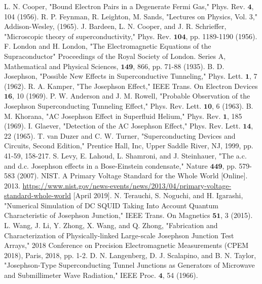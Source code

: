 \documentclass[letterpaper,english,reprint, aps]{revtex4-1}
\begin{document}
\begin{thebibliography}{}
 L. N. Cooper, "Bound Electron Pairs in a Degenerate Fermi Gas," Phys. Rev. $\boldsymbol{4}$, 104 (1956).
 R. P. Feynman, R. Leighton, M. Sands, "Lectures on Physics, Vol. 3," Addison-Wesley, (1965). 
 J. Bardeen, L. N. Cooper, and J. R. Schrieffer, "Microscopic theory of superconductivity," Phys. Rev. $\boldsymbol{104}$, pp. 1189-1190 (1956). 
 F. London and  H. London, "The Electromagnetic Equations of the Supraconductor" Proceedings of the Royal Society of London. Series A, Mathematical and Physical Sciences, $\boldsymbol{149}$, 866, pp. 71-88 (1935). 
 B. D. Josephson, "Possible New Effects in Superconductive Tunneling," Phys. Lett. $\boldsymbol{1}$, 7 (1962).
 R. A. Kamper, "The Josephson Effect," IEEE Trans. On Electron Devices $\boldsymbol{16}$, 10 (1969).
 P. W. Anderson and J. M. Rowell, "Probable Observation of the Josephson Superconducting Tunneling Effect," Phys. Rev. Lett. $\boldsymbol{10}$, 6 (1963).
 B. M. Khorana, "AC Josephson Effect in Superfluid Helium," Phys. Rev. $\boldsymbol{1}$, 185 (1969).
 I. Glaever, "Detection of the AC Josephson Effect," Phys. Rev. Lett. $\boldsymbol{14}$, 22 (1965).
 T. van Duzer and C. W. Turner, "Superconducting Devices and Circuits, Second Edition," Prentice Hall, Inc, Upper Saddle River, NJ, 1999, pp. 41-59, 158-217. 
	S. Levy, E. Lahoud, L. Shamroni, and J. Steinhauer, "The a.c. and d.c. Josephson effects in a Bose-Einstein condensate," Nature $\boldsymbol{449}$, pp. 579-583 (2007).
 NIST. A Primary Voltage Standard for the Whole World [Online]. 2013. \href{https://www.nist.gov/news-events/news/2013/04/primary-voltage-standard-whole-world}{https://www.nist.gov/news-events/news/2013/04/primary-voltage-standard-whole-world} [April 2019].
	N. Terauchi, S. Noguchi, and H. Igarashi, "Numerical Simulation of DC SQUID Taking Into Account Quantum Characteristic of Josephson Junction," IEEE Trans. On Magnetics $\boldsymbol{51}$, 3 (2015).
	L. Wang, J. Li, Y. Zhong, X. Wang, and Q. Zhong, "Fabrication and Characterization of Physically-linked Large-scale Josephson Junction Test Arrays," 2018 Conference on Precision Electromagnetic Measurements (CPEM 2018), Paris, 2018, pp. 1-2.
	D. N. Langenberg, D. J. Scalapino, and B. N. Taylor, "Josephson-Type Superconducting Tunnel Junctions as Generators of Microwave and Submillimeter Wave Radiation," IEEE Proc. $\boldsymbol{4}$, 54 (1966).

\end{thebibliography}
\end{document}
